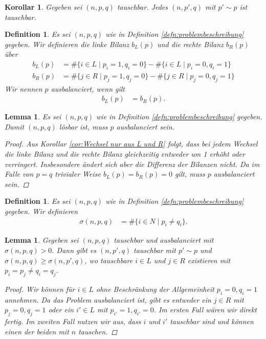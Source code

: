 \documentclass[12pt]{article}
\newtheorem{defn}[thm]{Definition}
\newtheorem{lem}[thm]{Lemma}
\newtheorem{cor}[thm]{Korollar}
\begin{document}
\begin{cor}
Gegeben sei $(n, p, q)$ tauschbar. Jedes $(n, p', q)$ mit $p'\sim p$ ist tauschbar.
\label{cor:einmal tauschbar immer tauschbar}
\end{cor}


\begin{defn}
Es sei $(n, p, q)$ wie in Definition \ref{defn:problembeschreibung} gegeben. Wir definieren die linke Bilanz $b_L(p)$ und die rechte Bilanz $b_R(p)$ über
\begin{align*}
b_L(p) &=\#\{i\in L \mid p_i=1, q_i=0\}
-
\#\{i\in L \mid p_i=0, q_i=1\}
\\
b_R(p) &= \#\{j\in R \mid p_j=1, q_j=0\}
-
\#\{j\in R \mid p_j=0, q_j=1\}
\end{align*}
Wir nennen  $p$ ausbalanciert, wenn gilt 
\begin{align*}
b_L(p) &= b_R(p).
\end{align*}
\end{defn}


\begin{lem}
 Es sei $(n, p, q)$ wie in Definition \ref{defn:problembeschreibung} gegeben. Damit $(n, p, q)$ lösbar ist, muss $p$ ausbalanciert sein.
\begin{proof}
Aus Korollar \ref{cor:Wechsel nur aus L und R} folgt, dass bei jedem Wechsel die linke Bilanz und die rechte Bilanz gleichzeitig entweder um 1 erhöht oder verringert. Insbesondere ändert sich aber die Differenz der Bilanzen nicht. Da im Falle von $p=q$ trivialer Weise $b_L(p)=b_R(p)=0$ gilt, muss $p$ ausbalanciert sein.
\end{proof}
\label{lem_ausbalanciert}
\end{lem}

\begin{defn}
Es sei $(n, p, q)$ wie in Definition \ref{defn:problembeschreibung} gegeben. Wir definieren
\begin{align*}
\sigma(n, p, q) 
&=\#\{i\in N \mid p_i\neq q_i\}.
\end{align*}
\end{defn}

\begin{lem}
Gegeben sei $(n, p, q)$ tauschbar und ausbalanciert mit $\sigma(n, p, q)>0$. Dann gibt es $(n, p', q)$ tauschbar mit $p'\sim p$ und $\sigma(n, p, q)\geq\sigma(n, p', q)$, wo tauschbare $i\in L$ und $j\in R$ existieren mit $p_i=p_j\neq q_i=q_j$.
\begin{proof}
 Wir können für $i\in L$  ohne Beschränkung der Allgemeinheit $p_i=0, q_i=1$ annehmen.
 Da das Problem ausbalanciert ist, gibt es entweder ein $j\in R$ mit $p_j=0, q_j=1$ oder ein $i'\in L$ mit $p_{i'}=1, q_{i'}=0$. Im ersten Fall wären wir direkt fertig. Im zweiten Fall nutzen wir aus, dass $i$ und $i'$ tauschbar sind und können einen der beiden mit $n$ tauschen.
\end{proof}
\label{lem:tausch auf beiden seiten}
\end{lem}
\end{document}
